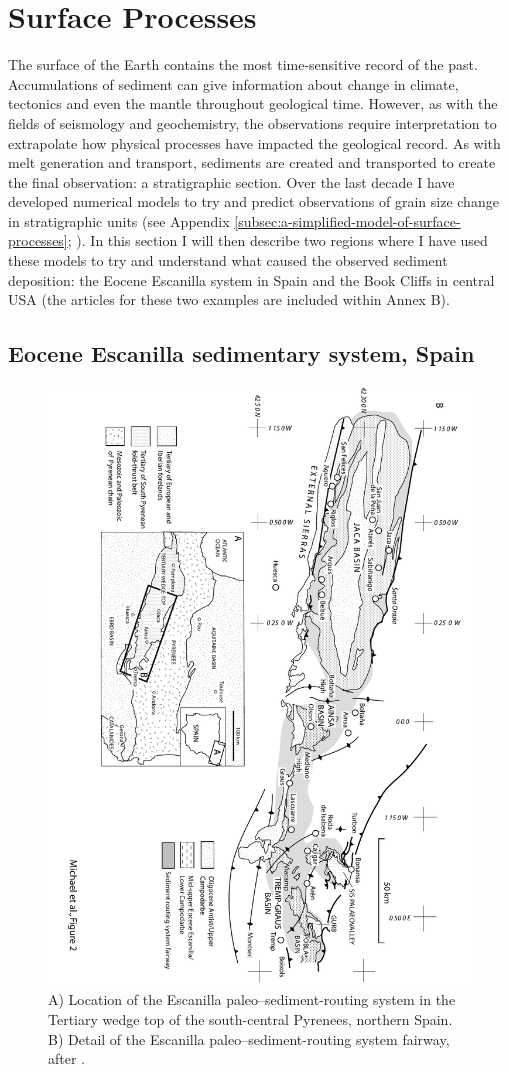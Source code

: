\section{Surface Processes}

The surface of the Earth contains the most time-sensitive record of the past. Accumulations of sediment can give information about change in climate, tectonics and even the mantle throughout geological time. However, as with the fields of seismology and geochemistry, the observations require interpretation to extrapolate how physical processes have impacted the geological record. As with melt generation and transport, sediments are created and transported to create the final observation: a stratigraphic section. Over the last decade I have developed numerical models to try and predict observations of grain size change in stratigraphic units (see Appendix \ref{subsec:a-simplified-model-of-surface-processes}; \citealp{armitage-etal-ngeo-2011,armitage-etal-2015,armitage-etal-br-2018,armitage-2019}). In this section I will then describe two regions where I have used these models to try and understand what caused the observed sediment deposition: the Eocene Escanilla system in Spain and the Book Cliffs in central USA (the articles for these two examples are included within Annex B).

\subsection{Eocene Escanilla sedimentary system, Spain}

\begin{figure}
\includegraphics[height=\textwidth,angle=90]{./figures/ch2-escanilla-map.pdf}
\caption{A) Location of the Escanilla paleo--sediment-routing system in the Tertiary wedge top of the south-central Pyrenees, northern Spain. B) Detail of the Escanilla paleo--sediment-routing system fairway, after \cite{michael-etal-2014a}.}
\label{fg:escanilla-map}
\end{figure}

